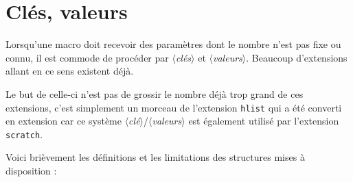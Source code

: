 \documentclass[french,a4paper,10pt]{article}
\makeatletter
\def\longfrhlstdate@i#1/#2/#3\@nil{\number#3\relax\space \ifcase#2 \or janvier\or février\or mars\or avril\or mai\or juin\or juillet\or aout\or septembre\or octobre\or novembre\or décembre\fi\space#1}
\edef\longfrhlstdate{\expandafter\longfrhlstdate@i\skvdate\@nil}
\def\<#1>{$\langle$\textit{#1}$\rangle$}
\makeatother
\begin{document}
\parindent=0pt
\thispagestyle{empty}

\section{Clés, valeurs}
Lorsqu'une macro doit recevoir des paramètres dont le nombre n'est pas fixe ou connu, il est commode de procéder par \<clés> et \<valeurs>. Beaucoup d'extensions allant en ce sens existent déjà.

Le but de celle-ci n'est pas de grossir le nombre déjà trop grand de ces extensions, c'est simplement un morceau de l'extension \texttt{hlist} qui a été converti en extension car ce système \<clé>/\<valeurs> est également utilisé par l'extension \texttt{scratch}.\medskip

Voici brièvement les définitions et les limitations des structures mises à disposition :
\end{document}
